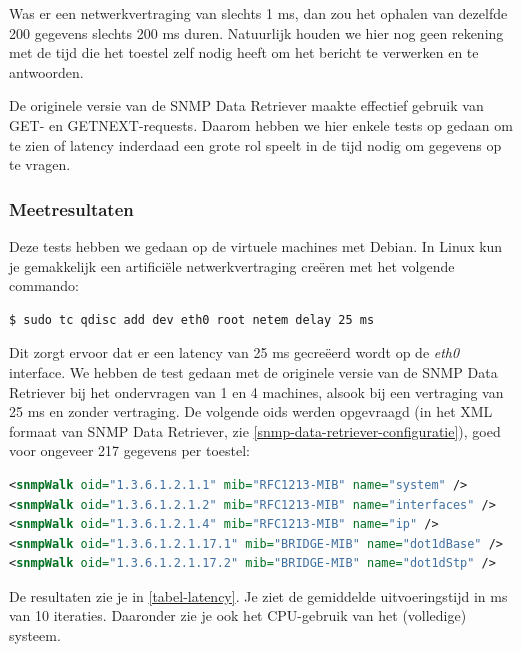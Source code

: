 Was er een netwerkvertraging van slechts 1 ms, dan zou het ophalen van dezelfde 200 gegevens slechts 200 ms duren.
Natuurlijk houden we hier nog geen rekening met de tijd die het toestel zelf nodig heeft om het bericht te verwerken en te antwoorden.

De originele versie van de SNMP Data Retriever maakte effectief gebruik van GET- en GETNEXT-requests.
Daarom hebben we hier enkele tests op gedaan om te zien of latency inderdaad een grote rol speelt in de tijd nodig om gegevens op te vragen.

\subsubsection{Meetresultaten}

Deze tests hebben we gedaan op de virtuele machines met Debian.
In Linux kun je gemakkelijk een artificiële netwerkvertraging creëren met het volgende commando:

\begin{lstlisting}[language=bash, caption={Artificiële netwerkvertraging van 25ms op de eth0 interface}]
$ sudo tc qdisc add dev eth0 root netem delay 25 ms
\end{lstlisting}

Dit zorgt ervoor dat er een latency van 25 ms gecreëerd wordt op de \textit{eth0} interface.
We hebben de test gedaan met de originele versie van de SNMP Data Retriever bij het ondervragen van 1 en 4 machines,
alsook bij een vertraging van 25 ms en zonder vertraging.
De volgende \glspl{oid} werden opgevraagd (in het XML formaat van SNMP Data Retriever, zie \cref{snmp-data-retriever-configuratie}),
goed voor ongeveer 217 gegevens per toestel:

\begin{lstlisting}[language=xml]
<snmpWalk oid="1.3.6.1.2.1.1" mib="RFC1213-MIB" name="system" />
<snmpWalk oid="1.3.6.1.2.1.2" mib="RFC1213-MIB" name="interfaces" />
<snmpWalk oid="1.3.6.1.2.1.4" mib="RFC1213-MIB" name="ip" />
<snmpWalk oid="1.3.6.1.2.1.17.1" mib="BRIDGE-MIB" name="dot1dBase" />
<snmpWalk oid="1.3.6.1.2.1.17.2" mib="BRIDGE-MIB" name="dot1dStp" />
\end{lstlisting}

De resultaten zie je in \cref{tabel-latency}.
Je ziet de gemiddelde uitvoeringstijd in ms van 10 iteraties.
Daaronder zie je ook het CPU-gebruik van het (volledige) systeem.

